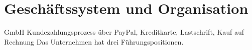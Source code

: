 \chapter{Geschäftssystem und Organisation}
\label{cha:5}
GmbH
Kundezahlungsprozess über PayPal, Kreditkarte, Lastschrift, Kauf auf Rechnung
Das Unternehmen hat drei Führungspositionen.